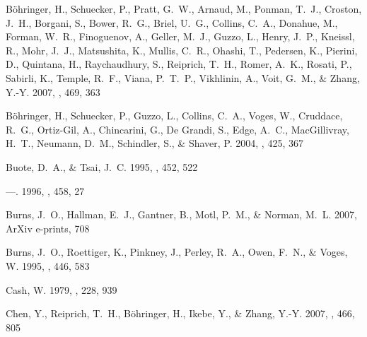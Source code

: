 \documentclass[apj]{emulateapj}
\begin{document}
\begin{thebibliography}{}
{B{\"o}hringer}, H., {Schuecker}, P., {Pratt}, G.~W., {Arnaud}, M.,
  {Ponman}, T.~J., {Croston}, J.~H., {Borgani}, S., {Bower}, R.~G.,
  {Briel}, U.~G., {Collins}, C.~A., {Donahue}, M., {Forman}, W.~R.,
  {Finoguenov}, A., {Geller}, M.~J., {Guzzo}, L., {Henry}, J.~P.,
  {Kneissl}, R., {Mohr}, J.~J., {Matsushita}, K., {Mullis}, C.~R.,
  {Ohashi}, T., {Pedersen}, K., {Pierini}, D., {Quintana}, H.,
  {Raychaudhury}, S., {Reiprich}, T.~H., {Romer}, A.~K., {Rosati}, P.,
  {Sabirli}, K., {Temple}, R.~F., {Viana}, P.~T.~P., {Vikhlinin}, A.,
  {Voit}, G.~M., \& {Zhang}, Y.-Y. 2007, \aap, 469, 363

{B{\"o}hringer}, H., {Schuecker}, P., {Guzzo}, L., {Collins}, C.~A., {Voges},
  W., {Cruddace}, R.~G., {Ortiz-Gil}, A., {Chincarini}, G., {De Grandi}, S.,
  {Edge}, A.~C., {MacGillivray}, H.~T., {Neumann}, D.~M., {Schindler}, S., \&
  {Shaver}, P. 2004, \aap, 425, 367

{Buote}, D.~A., \& {Tsai}, J.~C. 1995, \apj, 452, 522

---. 1996, \apj, 458, 27

{Burns}, J.~O., {Hallman}, E.~J., {Gantner}, B., {Motl}, P.~M., \& {Norman},
  M.~L. 2007, ArXiv e-prints, 708

{Burns}, J.~O., {Roettiger}, K., {Pinkney}, J., {Perley}, R.~A., {Owen}, F.~N.,
  \& {Voges}, W. 1995, \apj, 446, 583

{Cash}, W. 1979, \apj, 228, 939

{Chen}, Y., {Reiprich}, T.~H., {B{\"o}hringer}, H., {Ikebe}, Y., \& {Zhang},
  Y.-Y. 2007, \aap, 466, 805


\end{thebibliography}
\end{document}
